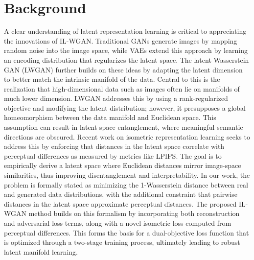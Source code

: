 \documentclass{article} %
\begin{document}
\section{Background}
\label{sec:background}
A clear understanding of latent representation learning is critical to appreciating the innovations of IL-WGAN. Traditional GANs generate images by mapping random noise into the image space, while VAEs extend this approach by learning an encoding distribution that regularizes the latent space. The latent Wasserstein GAN (LWGAN) further builds on these ideas by adapting the latent dimension to better match the intrinsic manifold of the data. Central to this is the realization that high-dimensional data such as images often lie on manifolds of much lower dimension. LWGAN addresses this by using a rank-regularized objective and modifying the latent distribution; however, it presupposes a global homeomorphism between the data manifold and Euclidean space. This assumption can result in latent space entanglement, where meaningful semantic directions are obscured. Recent work on isometric representation learning seeks to address this by enforcing that distances in the latent space correlate with perceptual differences as measured by metrics like LPIPS. The goal is to empirically derive a latent space where Euclidean distances mirror image-space similarities, thus improving disentanglement and interpretability. In our work, the problem is formally stated as minimizing the 1-Wasserstein distance between real and generated data distributions, with the additional constraint that pairwise distances in the latent space approximate perceptual distances. The proposed IL-WGAN method builds on this formalism by incorporating both reconstruction and adversarial loss terms, along with a novel isometric loss computed from perceptual differences. This forms the basis for a dual-objective loss function that is optimized through a two-stage training process, ultimately leading to robust latent manifold learning.
\end{document}
